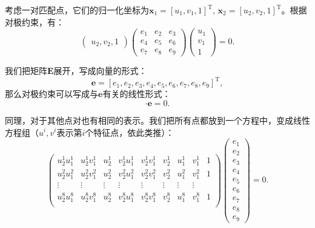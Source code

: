 考虑一对匹配点，它们的归一化坐标为$\bm{x}_{1}=[u_{1},v_{1},1]^\mathrm{T}$, $\bm{x}_{2}=[u_{2},v_{2},1]^{\mathrm{T}}$。根据对极约束，有：
\begin{equation}
\begin{pmatrix} 
u_{2},v_{2},1
\end{pmatrix}
\begin{pmatrix}
 e_{1} & e_{2} & e_{3}\\ 
 e_{4} & e_{5} & e_{6}\\ 
 e_{7} & e_{8} & e_{9} 
\end{pmatrix}
\begin{pmatrix} 
u_{1}\\v_{1}\\1
\end{pmatrix}
=0.
\end{equation}

我们把矩阵$\bm{E}$展开，写成向量的形式：
\[
\bm{e}= [e_{1},e_{2},e_{3},e_{4},e_{5},e_{6},e_{7},e_{8},e_{9}]^{\mathrm{T}},
\]
那么对极约束可以写成与$\bm{e}$有关的线性形式：
\begin{equation}
[u_{2}u_{1},u_{2}v_{1},u_{2},v_{2}u_{1},v_{2}v_{1},v_{2},u_{1},v_{1},1] \cdot  \bm{e}=0.
\end{equation}

同理，对于其他点对也有相同的表示。我们把所有点都放到一个方程中，变成线性方程组（$u^i, v^i$表示第$i$个特征点，依此类推）：
\begin{equation}
\label{Eq:eight-point}
\begin{pmatrix}
u_{2}^{1}u_{1}^{1}& u_{2}^{1}v_{1}^{1}& u_{2}^{1}& v_{2}^{1}u_{1}^{1}& v_{2}^{1}v_{1}^{1}& v_{2}^{1} &u_{1}^{1} &v_{1}^{1}&1\\
u_{2}^{2}u_{1}^{2}& u_{2}^{2}v_{1}^{2}& u_{2}^{2}& v_{2}^{2}u_{1}^{2}& v_{2}^{2}v_{1}^{2}& v_{2}^{2} &u_{1}^{2} &v_{1}^{2}&1\\
\vdots & \vdots & \vdots & \vdots & \vdots & \vdots & \vdots & \vdots \\
u_{2}^{8}u_{1}^{8}& u_{2}^{8}v_{1}^{8}& u_{2}^{8}& v_{2}^{8}u_{1}^{8}& v_{2}^{8}v_{1}^{8}& v_{2}^{8} &u_{1}^{8}&v_{1}^{8}&1\\
\end{pmatrix}
\begin{pmatrix}
e_{1}\\ e_{2}\\ e_{3}\\  e_{4}\\ e_{5}\\ e_{6}\\ e_{7}\\ e_{8}\\ e_{9}  
\end{pmatrix}
=0.
\end{equation}


